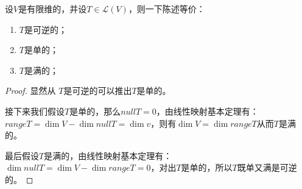 \documentclass[10pt,a4paper,UTF8]{article}
\begin{document}
\begin{theorem}
设\(V\)是有限维的，并设\(T\in \mathcal{L}(V)\)，则一下陈述等价：
\begin{enumerate}
\item \(T\)是可逆的；
\item \(T\)是单的；
\item \(T\)是满的；
\end{enumerate}
\end{theorem}

\begin{proof}
显然从 \(T\)是可逆的可以推出\(T\)是单的。

接下来我们假设\(T\)是单的，那么\(nullT = 0\)，由线性映射基本定理有：\(rangeT = \dim V - \dim nullT = \dim v\)，则有\(\dim V = \dim rangeT\)从而\(T\)是满的。 

最后假设\(T\)是满的，由线性映射基本定理有：\(\dim nullT = \dim V - \dim rangeT = 0\)，对出\(T\)是单的，所以\(T\)既单又满是可逆的。
\end{proof}
\end{document}
